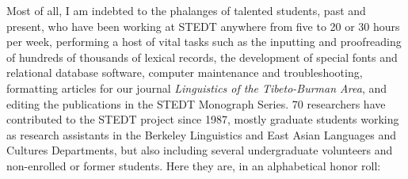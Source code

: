Most of all, I am indebted to the phalanges of talented students, past and present, who have been working at STEDT anywhere from five to 20 or 30 hours per week, performing a host of vital tasks such as the inputting and proofreading of hundreds of thousands of lexical records, the development of special fonts and relational database software, computer maintenance and troubleshooting, formatting articles for our journal {\it Linguistics of the Tibeto-Burman Area}, and editing the publications in the STEDT Monograph Series. 70 researchers have contributed to the STEDT project since 1987, mostly graduate students working as research assistants in the Berkeley Linguistics and East Asian Languages and Cultures Departments, but also including several undergraduate volunteers and non-enrolled or former students. Here they are, in an alphabetical honor roll:

